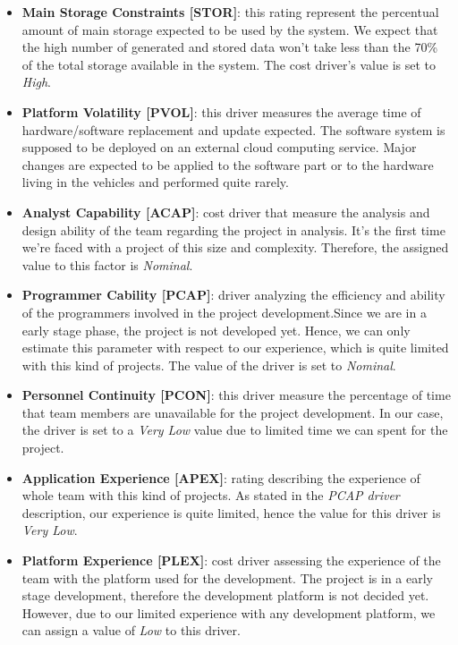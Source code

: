 \begin{itemize}
	\item \textbf{Main Storage Constraints [STOR]}: this rating represent the percentual amount of main storage expected to be used by the system.
We expect that the high number of generated and stored data won't take less than the 70\% of the total storage available in the system.
The cost driver's value is set to \textit{High}.

	\item \textbf{Platform Volatility [PVOL]}: this driver measures the average time of hardware/software replacement and update expected.
The software system is supposed to be deployed on an external cloud computing service. Major changes are expected to be applied to the software part or to the hardware living in the vehicles and performed quite rarely.

	\item \textbf{Analyst Capability [ACAP]}: cost driver that measure the analysis and design ability of the team regarding the project in analysis.
It's the first time we're faced with a project of this size and complexity. Therefore, the assigned value to this factor is \textit{Nominal}.

	\item \textbf{Programmer Cability [PCAP]}: driver analyzing the efficiency and ability of the programmers involved in the project development.Since we are in a early stage phase, the project is not developed yet. Hence, we can only estimate this parameter with respect to our experience, which is quite limited with this kind of projects. The value of the driver is set to \textit{Nominal}.

	\item \textbf{Personnel Continuity [PCON]}: this driver measure the percentage of time that team members are unavailable for the project development.
In our case, the driver is set to a \textit{Very Low} value due to limited time we can spent for the project.

	\item \textbf{Application Experience [APEX]}: rating describing the experience of whole team with this kind of projects.
As stated in the \textit{PCAP driver} description, our experience is quite limited, hence the value for this driver is \textit{Very Low}.

	\item \textbf{Platform Experience [PLEX]}: cost driver assessing the experience of the team with the platform used for the development.
The project is in a early stage development, therefore the development platform is not decided yet. However, due to our limited experience with any development platform, we can assign a value of \textit{Low} to this driver.


\end{itemize}
